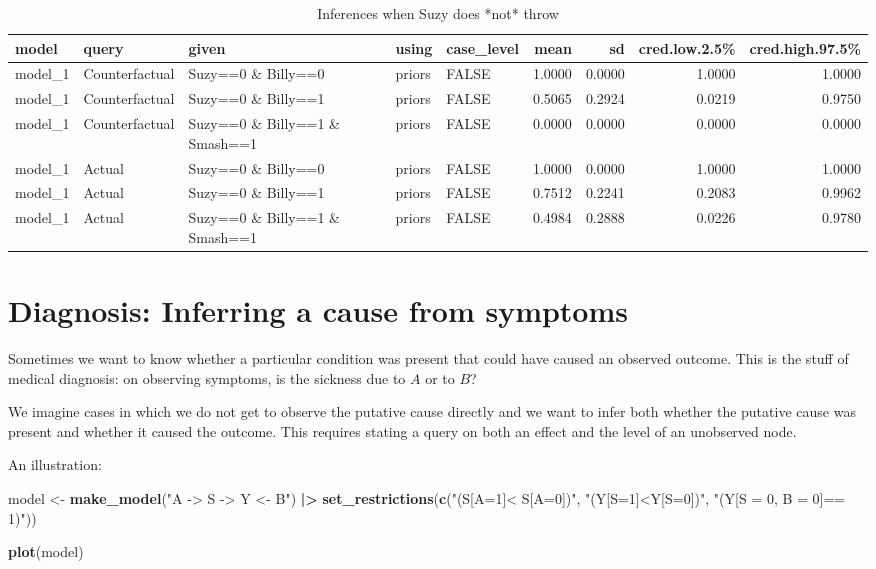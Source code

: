 \documentclass[
  12pt,
]{book}
\newenvironment{Shaded}{\begin{snugshade}}{\end{snugshade}}
\newcommand{\FunctionTok}[1]{\textcolor[rgb]{0.13,0.29,0.53}{\textbf{#1}}}
\newcommand{\NormalTok}[1]{#1}
\newcommand{\OtherTok}[1]{\textcolor[rgb]{0.56,0.35,0.01}{#1}}
\newcommand{\SpecialCharTok}[1]{\textcolor[rgb]{0.81,0.36,0.00}{\textbf{#1}}}
\newcommand{\StringTok}[1]{\textcolor[rgb]{0.31,0.60,0.02}{#1}}
\begin{document}
\begin{table}

\caption{\label{tab:appbillysuzy3}Inferences when Suzy does *not* throw}
\centering
\begin{tabular}[t]{l|l|l|l|l|r|r|r|r}
\hline
model & query & given & using & case\_level & mean & sd & cred.low.2.5\% & cred.high.97.5\%\\
\hline
model\_1 & Counterfactual & Suzy==0 \& Billy==0 & priors & FALSE & 1.0000 & 0.0000 & 1.0000 & 1.0000\\
\hline
model\_1 & Counterfactual & Suzy==0 \& Billy==1 & priors & FALSE & 0.5065 & 0.2924 & 0.0219 & 0.9750\\
\hline
model\_1 & Counterfactual & Suzy==0 \& Billy==1 \& Smash==1 & priors & FALSE & 0.0000 & 0.0000 & 0.0000 & 0.0000\\
\hline
model\_1 & Actual & Suzy==0 \& Billy==0 & priors & FALSE & 1.0000 & 0.0000 & 1.0000 & 1.0000\\
\hline
model\_1 & Actual & Suzy==0 \& Billy==1 & priors & FALSE & 0.7512 & 0.2241 & 0.2083 & 0.9962\\
\hline
model\_1 & Actual & Suzy==0 \& Billy==1 \& Smash==1 & priors & FALSE & 0.4984 & 0.2888 & 0.0226 & 0.9780\\
\hline
\end{tabular}
\end{table}

\hypertarget{diagnosis-inferring-a-cause-from-symptoms}{%
\section{Diagnosis: Inferring a cause from symptoms}\label{diagnosis-inferring-a-cause-from-symptoms}}

Sometimes we want to know whether a particular condition was present that could have caused an observed outcome. This is the stuff of medical diagnosis: on observing symptoms, is the sickness due to \(A\) or to \(B\)?

We imagine cases in which we do not get to observe the putative cause directly and we want to infer both whether the putative cause was present and whether it caused the outcome. This requires stating a query on both an effect and the level of an unobserved node.

An illustration:

\begin{Shaded}
\begin{Highlighting}[]
\NormalTok{model }\OtherTok{\textless{}{-}} \FunctionTok{make\_model}\NormalTok{(}\StringTok{"A {-}\textgreater{} S {-}\textgreater{} Y \textless{}{-} B"}\NormalTok{) }\SpecialCharTok{|\textgreater{}}
  \FunctionTok{set\_restrictions}\NormalTok{(}\FunctionTok{c}\NormalTok{(}\StringTok{"(S[A=1]\textless{} S[A=0])"}\NormalTok{, }
                   \StringTok{"(Y[S=1]\textless{}Y[S=0])"}\NormalTok{,}
                   \StringTok{"(Y[S = 0, B = 0]== 1)"}\NormalTok{))}

\FunctionTok{plot}\NormalTok{(model)}
\end{Highlighting}
\end{Shaded}
\end{document}
